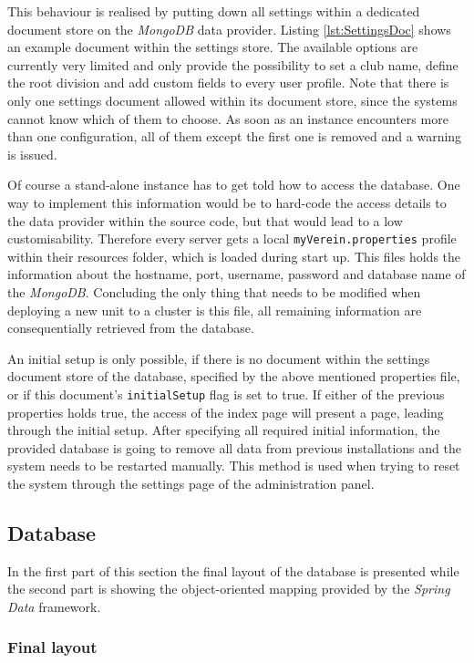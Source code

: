 This behaviour is realised by putting down all settings within a dedicated document store on the \emph{MongoDB} data provider. Listing \vref{lst:SettingsDoc} shows an example document within the settings store. The available options are currently very limited and only provide the possibility to set a club name, define the root division and add custom fields to every user profile. Note that there is only one settings document allowed within its document store, since the systems cannot know which of them to choose. As soon as an instance encounters more than one configuration, all of them except the first one is removed and a warning is issued. 

Of course a stand-alone instance has to get told how to access the database. One way to implement this information would be to hard-code the access details to the data provider within the source code, but that would lead to a low customisability. Therefore every server gets a local \texttt{myVerein.properties} profile within their resources folder, which is loaded during start up. This files holds the information about the hostname, port, username, password and database name of the \emph{MongoDB}. Concluding the only thing that needs to be modified when deploying a new unit to a cluster is this file, all remaining information are consequentially retrieved from the database.

An initial setup is only possible, if there is no document within the settings document store of the database, specified by the above mentioned properties file, or if this document's \texttt{initialSetup} flag is set to true. If either of the previous properties holds true, the access of the index page will present a page, leading through the initial setup. After specifying all required initial information, the provided database is going to remove all data from previous installations and the system needs to be restarted manually. This method is used when trying to reset the system through the settings page of the administration panel. 

\subsection{Database}
\label{sec:ImplementationDB}

In the first part of this section the final layout of the database is presented while the second part is showing the object-oriented mapping provided by the \emph{Spring Data} framework. 

\subsubsection{Final layout}
\label{sec:DatabaseFinal}

